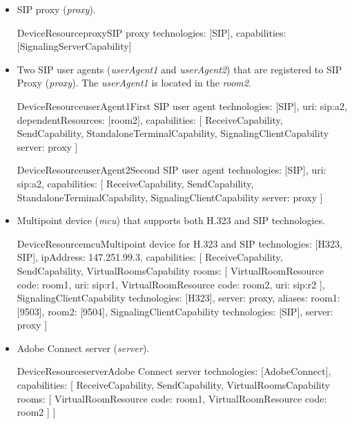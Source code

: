 \begin{itemize}
\item SIP proxy (\emph{proxy}).

\begin{ResourceExample}{DeviceResource}{proxy}{SIP proxy}
technologies: [SIP], 
capabilities: [SignalingServerCapability]
\end{ResourceExample}

\item Two SIP user agents (\emph{userAgent1} and \emph{userAgent2}) that are
  registered to SIP Proxy (\emph{proxy}). The \emph{userAgent1} is located in
  the \emph{room2}.
  
\begin{ResourceExample}{DeviceResource}{userAgent1}{First SIP user agent}
technologies: [SIP],
uri: sip:a2,
dependentResources: [room2],
capabilities: [
  ReceiveCapability, SendCapability,
  StandaloneTerminalCapability,
  SignalingClientCapability {server: proxy}
]
\end{ResourceExample}

\begin{ResourceExample}{DeviceResource}{userAgent2}{Second SIP user agent}
technologies: [SIP],
uri: sip:a2,
capabilities: [
  ReceiveCapability, SendCapability,
  StandaloneTerminalCapability,
  SignalingClientCapability {server: proxy}
]
\end{ResourceExample}

\item Multipoint device (\emph{mcu}) that supports both H.323 and SIP 
  technologies.
  
\begin{ResourceExample}{DeviceResource}{mcu}{Multipoint device for H.323 and SIP}
technologies: [H323, SIP], 
ipAddress: 147.251.99.3,
capabilities: [
  ReceiveCapability, SendCapability,
  VirtualRoomsCapability {rooms: [
    VirtualRoomResource {code: room1, uri: sip:r1},
    VirtualRoomResource {code: room2, uri: sip:r2}
  ]},
  SignalingClientCapability {technologies: [H323], server: proxy, 
     aliases: {room1: [9503], room2: [9504]}},
  SignalingClientCapability {technologies: [SIP], server: proxy}
]
\end{ResourceExample}

\item Adobe Connect server (\emph{server}).

\begin{ResourceExample}{DeviceResource}{server}{Adobe Connect server}
technologies: [AdobeConnect],
capabilities: [
  ReceiveCapability, SendCapability,
  VirtualRoomsCapability {rooms: [ 
    VirtualRoomResource {code: room1}, 
    VirtualRoomResource {code: room2}
  ]}
]
\end{ResourceExample}


\end{itemize}

